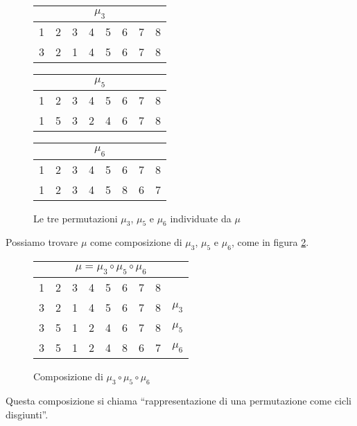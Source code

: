 \begin{figure}[ht]
\centering
\begin{tabular}{*{8}{c}}
\multicolumn{8}{c}{$\mu_3$} \\
\hline
\cellcolor{green!20} 1 & 2 & \cellcolor{green!20} 3 & 4 & 5 & 6 & 7 & 8 \\
\cellcolor{green!20} 3 & 2 & \cellcolor{green!20} 1 & 4 & 5 & 6 & 7 & 8
\end{tabular}
\qquad
\begin{tabular}{*{8}{c}}
\multicolumn{8}{c}{$\mu_5$} \\
\hline
1 & \cellcolor{green!20} 2 & 3 & \cellcolor{green!20} 4 & \cellcolor{green!20} 5 & 6 & 7 & 8 \\
1 & \cellcolor{green!20} 5 & 3 & \cellcolor{green!20} 2 & \cellcolor{green!20} 4 & 6 & 7 & 8
\end{tabular}
\qquad
\begin{tabular}{*{8}{c}}
\multicolumn{8}{c}{$\mu_6$} \\
\hline
1 & 2 & 3 & 4 & 5 & \cellcolor{green!20} 6 & \cellcolor{green!20} 7 & \cellcolor{green!20} 8 \\
1 & 2 & 3 & 4 & 5 & \cellcolor{green!20} 8 & \cellcolor{green!20} 6 & \cellcolor{green!20} 7
\end{tabular}
\caption{Le tre permutazioni $\mu_3$, $\mu_5$ e $\mu_6$ individuate da $\mu$\label{fig:cicli_mu_scomposizioni}}
\end{figure}

Possiamo trovare $\mu$ come composizione di $\mu_3$, $\mu_5$ e $\mu_6$, come in figura \ref{fig:cicli_mu_composizione}.
\begin{figure}[ht]
\centering
\begin{tabular}{*{9}{c}}
\multicolumn{9}{c}{$\mu = \mu_3 \circ \mu_5 \circ \mu_6$} \\
\hline
1 & 2 & 3 & 4 & 5 & 6 & 7 & 8 & \\
\cellcolor{green!20} 3 & 2 & \cellcolor{green!20} 1 & 4 & 5 & 6 & 7 & 8 & $\mu_3$ \\
3 & \cellcolor{green!20} 5 & 1 & \cellcolor{green!20} 2 & \cellcolor{green!20} 4 & 6 & 7 & 8 & $\mu_5$ \\
3 & 5 & 1 & 2 & 4 & \cellcolor{green!20} 8 & \cellcolor{green!20} 6 & \cellcolor{green!20} 7 & $\mu_6$
\end{tabular}
\caption{Composizione di $\mu_3 \circ \mu_5 \circ \mu_6$\label{fig:cicli_mu_composizione}}
\end{figure}
Questa composizione si chiama ``rappresentazione di una permutazione come cicli disgiunti''.

